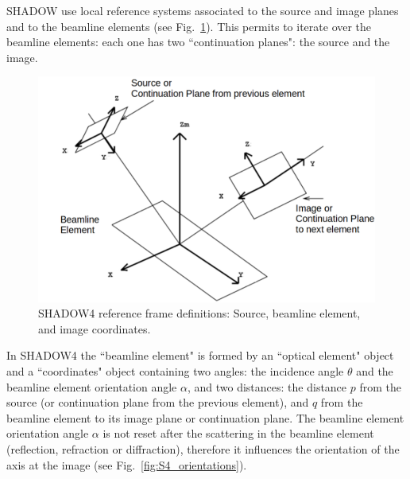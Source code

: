 \documentclass{iucr}
\begin{document}
SHADOW use local reference systems associated to the source and image planes and to the beamline elements (see Fig.~\ref{fig:S4_reference_frame}).
This permits to iterate over the beamline elements: each one has two ``continuation planes": the source and the image. 

\begin{figure}
\label{fig:S4_reference_frame}
    \centering
\includegraphics[width=0.9\linewidth]{figures/S4_reference_frame.png}
\caption{SHADOW4 reference frame definitions: Source, beamline element, and image coordinates.}  
\end{figure}

In SHADOW4 the ``beamline element" is formed by an ``optical element" object and a ``coordinates" object containing two angles: the incidence angle $\theta$ and the beamline element orientation angle $\alpha$, and two distances: the distance $p$ from the source (or continuation plane from the previous element), and $q$ from the beamline element to its image plane or continuation plane.
The beamline element orientation angle $\alpha$ is not reset after the scattering in the beamline element (reflection, refraction or diffraction), therefore it influences the orientation of the axis at the image (see Fig.~\ref{fig:S4_orientations}).
\end{document}
